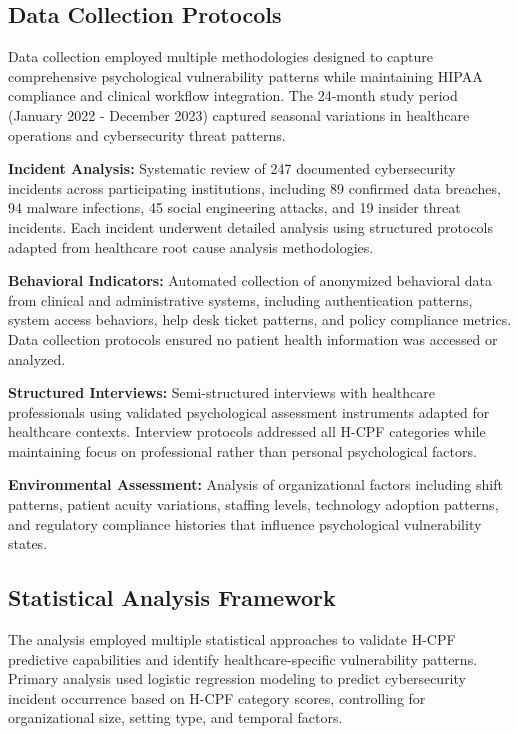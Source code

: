 \documentclass[10pt, twocolumn]{article}
\begin{document}
\subsection{Data Collection Protocols}

Data collection employed multiple methodologies designed to capture comprehensive psychological vulnerability patterns while maintaining HIPAA compliance and clinical workflow integration. The 24-month study period (January 2022 - December 2023) captured seasonal variations in healthcare operations and cybersecurity threat patterns.

\textbf{Incident Analysis:} Systematic review of 247 documented cybersecurity incidents across participating institutions, including 89 confirmed data breaches, 94 malware infections, 45 social engineering attacks, and 19 insider threat incidents. Each incident underwent detailed analysis using structured protocols adapted from healthcare root cause analysis methodologies.

\textbf{Behavioral Indicators:} Automated collection of anonymized behavioral data from clinical and administrative systems, including authentication patterns, system access behaviors, help desk ticket patterns, and policy compliance metrics. Data collection protocols ensured no patient health information was accessed or analyzed.

\textbf{Structured Interviews:} Semi-structured interviews with healthcare professionals using validated psychological assessment instruments adapted for healthcare contexts. Interview protocols addressed all H-CPF categories while maintaining focus on professional rather than personal psychological factors.

\textbf{Environmental Assessment:} Analysis of organizational factors including shift patterns, patient acuity variations, staffing levels, technology adoption patterns, and regulatory compliance histories that influence psychological vulnerability states.

\subsection{Statistical Analysis Framework}

The analysis employed multiple statistical approaches to validate H-CPF predictive capabilities and identify healthcare-specific vulnerability patterns. Primary analysis used logistic regression modeling to predict cybersecurity incident occurrence based on H-CPF category scores, controlling for organizational size, setting type, and temporal factors.
\end{document}
